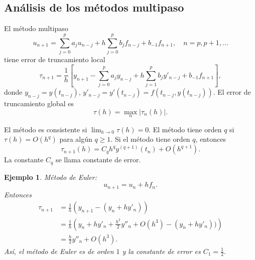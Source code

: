 \documentclass[11pt,letterpaper]{report}
\newtheorem{example}{Ejemplo}
\begin{document}
\subsection{Análisis de los métodos multipaso}
El método multipaso
\begin{equation}
  u_{n+1}
  =
  \sum_{j=0}^{p}a_ju_{n-j}
  +
  h
  \sum_{j=0}^{p}b_jf_{n-j} + b_{-1}f_{n+1},
  \quad
  n=p, p+1,\dots
\end{equation}
tiene error de truncamiento local
\begin{equation}
  \tau_{n+1}
  =
  \frac{1}{h}
  \left[
    y_{n+1}
    -
    \sum_{j=0}^{p} a_jy_{n-j}
    +
    h
    \sum_{j=1}^{p}b_{j}y'_{n-j}
    +
    b_{-1}f_{n+1}
  \right]
,\end{equation}
donde $y_{n-j}=y(t_{n-j})$,
$y'_{n-j}=y'(t_{n-j})=f(t_{n-j},y(t_{n-j}))$.
El error de truncamiento global es
\begin{equation}
  \tau(h) = \max_n |\tau_{n}(h)|
.\end{equation}

El método es consistente si $\lim_{h\to 0}\tau(h)=0$.
El método tiene orden $q$ si $\tau(h)=O(h^{q})$ para algún $q\geq 1$.
Si el método tiene orden $q$, entonces
\begin{equation}
  \tau_{n+1}(h) = C_qh^qy^{(q+1)}(t_n) + O(h^{q+1})
.\end{equation}
La constante $C_q$ se llama constante de error.

\begin{example}
  Método de Euler:
  \begin{equation}
    u_{n+1} = u_{n} + hf_n
  .\end{equation}
  Entonces
  \begin{align}
    \tau_{n+1}
    &= \frac{1}{h}(y_{n+1} - (y_n+hy'_n)) \\
    &= \frac{1}{h}
    \left(
    y_n + hy'_n + \frac{h^{2}}{2} y''_n + O(h^{3})
    - (y_n + hy'_n))
    \right)
    \\
    &= \frac{h}{2}y''_n + O(h^{3})
  .\end{align}
  Así, el método de Euler es de orden $1$ y la constante de error es
  $C_1=\frac{1}{2}$.
\end{example}
\end{document}
